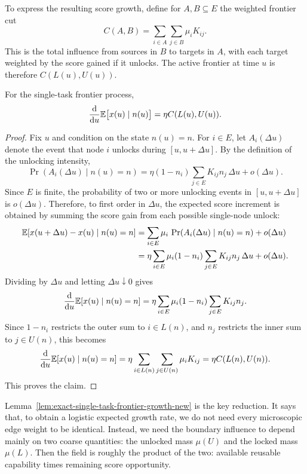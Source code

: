 To express the resulting score growth, define for \(A,B\subseteq E\) the weighted
frontier cut
\[
    C(A,B)=\sum_{i\in A}\sum_{j\in B}\mu_iK_{ij}.
\]
This is the total influence from sources in \(B\) to targets in \(A\), with each
target weighted by the score gained if it unlocks. The active frontier at time
\(u\) is therefore \(C(L(u),U(u))\).

\begin{lemma}
\label{lem:exact-single-task-frontier-growth-new}
For the single-task frontier process,
\[
    \frac{\mathrm{d}}{\mathrm{d}u}\mathbb{E}\bigl[x(u)\mid n(u)\bigr]
    =
    \eta C(L(u),U(u)).
\]
\end{lemma}

\begin{proof}
Fix \(u\) and condition on the state \(n(u)=n\). For \(i\in E\), let
\(A_i(\Delta u)\) denote the event that node \(i\) unlocks during
\([u,u+\Delta u]\). By the definition of the unlocking intensity,
\[
    \Pr(A_i(\Delta u)\mid n(u)=n)
    =
    \eta(1-n_i)\sum_{j\in E}K_{ij}n_j\,\Delta u
    +o(\Delta u).
\]
Since \(E\) is finite, the probability of two or more unlocking events in
\([u,u+\Delta u]\) is \(o(\Delta u)\). Therefore, to first order in
\(\Delta u\), the expected score increment is obtained by summing the score
gain from each possible single-node unlock:
\begin{align*}
    \mathbb{E}[x(u+\Delta u)-x(u)\mid n(u)=n]
    &=
    \sum_{i\in E}\mu_i\,
    \Pr(A_i(\Delta u)\mid n(u)=n)
    +o(\Delta u) \\
    &=
    \eta
    \sum_{i\in E}
    \mu_i(1-n_i)
    \sum_{j\in E}K_{ij}n_j\,\Delta u
    +o(\Delta u).
\end{align*}
Dividing by \(\Delta u\) and letting \(\Delta u\downarrow 0\) gives
\[
    \frac{\mathrm d}{\mathrm du}
    \mathbb{E}[x(u)\mid n(u)=n]
    =
    \eta
    \sum_{i\in E}
    \mu_i(1-n_i)
    \sum_{j\in E}K_{ij}n_j .
\]
Since \(1-n_i\) restricts the outer sum to \(i\in L(n)\), and \(n_j\) restricts
the inner sum to \(j\in U(n)\), this becomes
\[
    \frac{\mathrm d}{\mathrm du}
    \mathbb{E}[x(u)\mid n(u)=n]
    =
    \eta
    \sum_{i\in L(n)}
    \sum_{j\in U(n)}
    \mu_iK_{ij}
    =
    \eta C(L(n),U(n)).
\]
This proves the claim.
\end{proof}


Lemma~\ref{lem:exact-single-task-frontier-growth-new} is the key reduction. It says that, to obtain a logistic expected growth rate, we do not need every microscopic edge weight to be identical. Instead, we need the boundary influence to depend mainly on two coarse quantities: the unlocked mass $\mu(U)$ and the locked mass $\mu(L)$. Then the field is roughly the product of the two: available reusable capability times remaining score opportunity.

